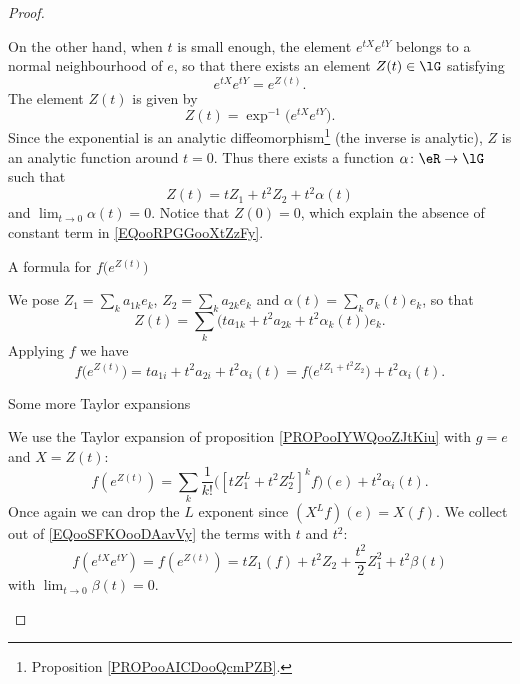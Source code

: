 \begin{proof}
\begin{subproof}
            On the other hand, when \( t\) is small enough, the element \(  e^{tX} e^{tY}\) belongs to a normal neighbourhood of \( e\), so that there exists an element \( Z(t)\in \lG\) satisfying
            \begin{equation}
                e^{tX} e^{tY}= e^{Z(t)}.
            \end{equation}
            The element \( Z(t)\) is given by
            \begin{equation}
                Z(t)=\exp^{-1}\big(  e^{tX} e^{tY} \big).
            \end{equation}
            Since the exponential is an analytic diffeomorphism\footnote{Proposition \ref{PROPooAICDooQcmPZB}.} (the inverse is analytic), \( Z\) is an analytic function around \( t=0\). Thus there exists a function \( \alpha\colon \eR\to \lG\) such that
            \begin{equation}        \label{EQooRPGGooXtZzFy}
                Z(t)=tZ_1+t^2Z_2+t^2\alpha(t)
            \end{equation}
            and \( \lim_{t\to 0} \alpha(t)=0\). Notice that \( Z(0)=0\), which explain the absence of constant term in \eqref{EQooRPGGooXtZzFy}.

        \item[A formula for \( f\big(  e^{Z(t)} \big)\)]

            We pose \( Z_1=\sum_ka_{1k}e_k\), \( Z_2=\sum_ka_{2k}e_k\) and \( \alpha(t)=\sum_k\sigma_k(t)e_k\), so that
            \begin{equation}
                Z(t)=\sum_k\big( ta_{1k}+t^2a_{2k}+t^2\alpha_k(t) \big)e_k.
            \end{equation}
            Applying \( f\) we have
            \begin{equation}
                f\big(  e^{Z(t)} \big)=ta_{1i}+t^2a_{2i}+t^2\alpha_i(t)=f\big(  e^{tZ_1+t^2Z_2} \big)+t^2\alpha_i(t).
            \end{equation}
            
        \item[Some more Taylor expansions]

            We use the Taylor expansion of proposition \ref{PROPooIYWQooZJtKiu} with \( g=e\) and \( X=Z(t)\):
            \begin{equation}        \label{EQooSFKOooDAavVy}
                f( e^{Z(t)})=\sum_k\frac{1}{ k! }\big( [tZ^L_1+t^2Z_2^L]^kf \big)(e)+t^2\alpha_i(t).
            \end{equation}
            Once again we can drop the \( L\) exponent since \( (X^Lf)(e)=X(f)\). We collect out of \eqref{EQooSFKOooDAavVy} the terms with \( t\) and \( t^2\):
            \begin{equation}        \label{EQooEYUSooTDntym}
                f( e^{tX} e^{tY})=f( e^{Z(t)})=tZ_1(f)+t^2 Z_2 +\frac{ t^2 }{2}Z_1^2 +t^2\beta(t)
            \end{equation}
            with \( \lim_{t\to 0} \beta(t)=0\).


\end{subproof}
\end{proof}
